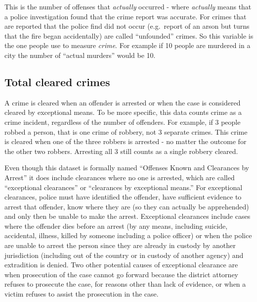 \documentclass[
  12pt,
  openany]{book}
\begin{document}
This is the number of offenses that \emph{actually} occurred - where \emph{actually} means that a police investigation found that the crime report was accurate. For crimes that are reported that the police find did not occur (e.g.~report of an arson but turns that the fire began accidentally) are called ``unfounded'' crimes. So this variable is the one people use to measure \emph{crime}. For example if 10 people are murdered in a city the number of ``actual murders'' would be 10.

\hypertarget{total-cleared-crimes}{%
\subsection{Total cleared crimes}\label{total-cleared-crimes}}

A crime is cleared when an offender is arrested or when the case is considered cleared by exceptional means. To be more specific, this data counts crime as a crime incident, regardless of the number of offenders. For example, if 3 people robbed a person, that is one crime of robbery, not 3 separate crimes. This crime is cleared when one of the three robbers is arrested - no matter the outcome for the other two robbers. Arresting all 3 still counts as a single robbery cleared.

Even though this dataset is formally named ``Offenses Known and Clearances by Arrest'' it does include clearances where no one is arrested, which are called ``exceptional clearances'' or ``clearances by exceptional means.'' For exceptional clearances, police must have identified the offender, have sufficient evidence to arrest that offender, know where they are (so they can actually be apprehended) and only then be unable to make the arrest. Exceptional clearances include cases where the offender dies before an arrest (by any means, including suicide, accidental, illness, killed by someone including a police officer) or when the police are unable to arrest the person since they are already in custody by another jurisdiction (including out of the country or in custody of another agency) and extradition is denied. Two other potential causes of exceptional clearance are when prosecution of the case cannot go forward because the district attorney refuses to prosecute the case, for reasons other than lack of evidence, or when a victim refuses to assist the prosecution in the case.
\end{document}
